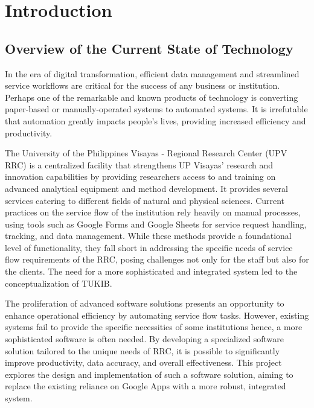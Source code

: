 \chapter{Introduction}
\label{sec:researchdesc}    %

\section{Overview of the Current State of Technology}
\label{sec:overview}

In the era of digital transformation, efficient data management and streamlined service workflows are critical for the success of any business or institution. Perhaps one of the remarkable and known products of technology is converting paper-based or manually-operated systems to automated systems. It is irrefutable that automation greatly impacts people's lives, providing increased efficiency and productivity.

The University of the Philippines Visayas - Regional Research Center (UPV RRC) is a centralized facility that strengthens UP Visayas’ research and innovation capabilities by providing researchers access to and training on advanced analytical equipment and method development. It provides several services catering to different fields of natural and physical sciences. Current practices on the service flow of the institution rely heavily on manual processes, using tools such as Google Forms and Google Sheets for service request handling, tracking, and data management. While these methods provide a foundational level of functionality, they fall short in addressing the specific needs of service flow requirements of the RRC, posing challenges not only for the staff but also for the clients. The need for a more sophisticated and integrated system led to the conceptualization of TUKIB.

The proliferation of advanced software solutions presents an opportunity to enhance operational efficiency by automating service flow tasks. However, existing systems fail to provide the specific necessities of some institutions hence, a more sophisticated software is often needed. By developing a specialized software solution tailored to the unique needs of RRC, it is possible to significantly improve productivity, data accuracy, and overall effectiveness. This project explores the design and implementation of such a software solution, aiming to replace the existing reliance on Google Apps with a more robust, integrated system.
  
